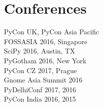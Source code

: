 \documentclass[]{deedy-resume-openfont}
\begin{document}
\begin{minipage}[t]{0.33\textwidth}

\section{Conferences}
PyCon UK, PyCon Asia Pacific \\
FOSSASIA 2016, Singapore \\
SciPy 2016, Austin, TX \\
PyGotham 2016, New York \\
PyCon CZ 2017, Prague \\
\textbullet{} Gnome Asia Summit 2016 \\
\textbullet{} PyDelhiConf 2017, 2016 \\
\textbullet{} PyCon India 2016, 2015
\sectionsep

%
%

\end{minipage} 
\hfill
\end{document}
